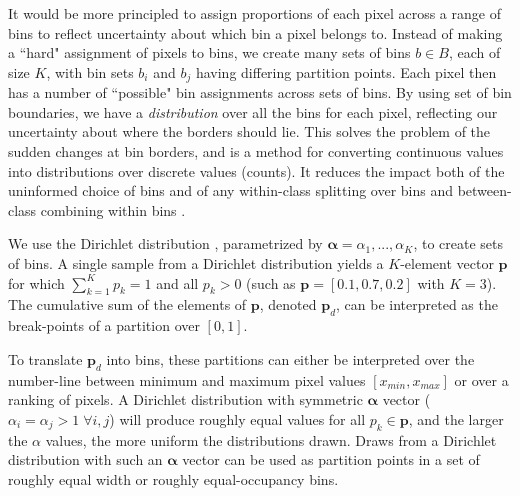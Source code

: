 \documentclass[
    ,final            %
  ]
  {aipproc}
\begin{document}
It would be more principled to assign proportions of each pixel across a range of bins to reflect uncertainty about which bin a pixel belongs to.
Instead of making a ``hard" assignment of pixels to bins,
we create many sets of bins $b \in B$, each of size $K$, with bin sets $b_i$ and $b_j$ having differing partition points. Each pixel then has a number of ``possible" bin assignments across sets of bins.
By using set of bin boundaries, 
we have a {\it distribution} over all the bins for each pixel, reflecting our uncertainty about where the borders should lie.
This solves the problem of the sudden changes at bin borders, and is a method for converting continuous values into distributions over discrete values (counts). It reduces the impact both of the uninformed choice of bins and of any within-class splitting over bins and between-class combining within bins \cite{clarke2000entropy}.

We use the Dirichlet distribution \cite{frigyik2010introduction,hoadley1969compound,ng2011dirichlet}, parametrized by $\boldsymbol{\alpha} = \alpha_1,...,\alpha_K$, to create sets of bins.
A single sample from a Dirichlet distribution
yields a $K$-element vector $\mathbf{p}$ for which $\sum_{k=1}^K p_k =
1$ and all $p_k > 0$ (such as $\mathbf{p}=[0.1,0.7,0.2]$ with
$K=3$). The cumulative sum of the elements of $\mathbf{p}$, denoted
$\mathbf{p}_d$, can be interpreted as the break-points of a partition
over $[0,1]$. %

To translate $\mathbf{p}_d$ into bins, these partitions can either be
interpreted over the number-line between minimum and maximum pixel
values $[x_{min}, x_{max}]$ or over a ranking of pixels.  A Dirichlet
distribution with symmetric $\boldsymbol{\alpha}$ vector ($\alpha_i
= \alpha_j > 1 \; \forall i,j$) will produce roughly equal values for
all $p_k \in \mathbf{p}$, and the larger the $\alpha$ values, the more
uniform the distributions drawn. Draws from a Dirichlet distribution
with such an $\boldsymbol{\alpha}$ vector can be used as partition
points in a set of roughly equal width or roughly equal-occupancy
bins.
\end{document}
